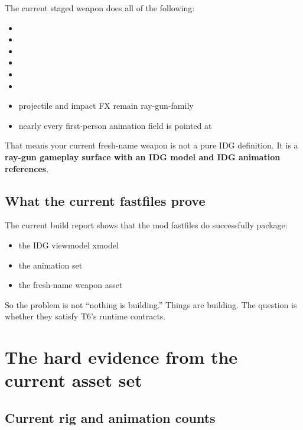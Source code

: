 \documentclass[11pt]{article}
\begin{document}
The current staged weapon does all of the following:

\begin{itemize}
  \item {}
  \item {}
  \item {}
  \item {}
  \item {}
  \item {}
  \item projectile and impact FX remain ray-gun-family
  \item nearly every first-person animation field is pointed at 
\end{itemize}

That means your current fresh-name weapon is not a pure IDG definition. It is a \textbf{ray-gun gameplay surface with an IDG model and IDG animation references}.

\subsection{What the current fastfiles prove}

The current build report shows that the mod fastfiles do successfully package:

\begin{itemize}
  \item the IDG viewmodel xmodel
  \item the  animation set
  \item the fresh-name  weapon asset
\end{itemize}

So the problem is not ``nothing is building.'' Things are building. The question is whether they satisfy T6's runtime contracts.

\section{The hard evidence from the current asset set}

\subsection{Current rig and animation counts}
\end{document}
